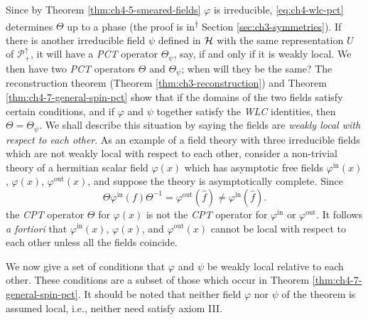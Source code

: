 Since by Theorem \ref{thm:ch4-5-smeared-fields} $\varphi$ is irreducible, \eqref{eq:ch4-wlc-pct} determines $\Theta$ up
to a phase (the proof is in\textsuperscript{\(\dagger\)} Section \ref{sec:ch3-symmetries}). If there
is another irreducible field $\psi$ defined in $\mathcal{H}$ with the same
representation $U$ of $\mathcal P_+^\uparrow$, it will have a \emph{PCT}
operator $\Theta_\psi$, say, if and only if it is weakly local. We then have
two \emph{PCT} operators $\Theta$ and $\Theta_\psi$; when will they be the
same? The reconstruction theorem (Theorem \ref{thm:ch3-reconstruction}) and Theorem \ref{thm:ch4-7-general-spin-pct} show that if
the domains of the two fields satisfy certain conditions, and if $\varphi$ and
$\psi$ together satisfy the \emph{WLC} identities, then
$\Theta=\Theta_\psi$. We shall describe
this situation by saying the fields are \emph{weakly local with respect to
each other}. As an example of a field theory with three irreducible fields
which are not weakly local with respect to each other, consider a non-trivial
theory of a hermitian scalar field $\varphi(x)$ which has asymptotic free
fields $\varphi^{\mathrm{in}}(x)$, $\varphi(x)$, $\varphi^{\mathrm{out}}(x)$,
and suppose the theory is asymptotically complete. Since
\begin{equation*}
  \Theta\varphi^{\mathrm{in}}(f)\Theta^{-1}
  =\varphi^{\mathrm{out}}(\widehat f)
  \ne \varphi^{\mathrm{in}}(\widehat f).
\end{equation*}
the \emph{CPT} operator $\Theta$ for $\varphi(x)$ is not the \emph{CPT}
operator for $\varphi^{\mathrm{in}}$ or $\varphi^{\mathrm{out}}$. It follows
\emph{a fortiori} that $\varphi^{\mathrm{in}}(x)$, $\varphi(x)$, and
$\varphi^{\mathrm{out}}(x)$ cannot be local with respect to each other unless
all the fields coincide.

We now give a set of conditions that $\varphi$ and $\psi$ be weakly local
relative to each other. These conditions are a subset of those which occur in
Theorem \ref{thm:ch4-7-general-spin-pct}. It should be noted that neither field $\varphi$ nor $\psi$ of the
theorem is assumed local, i.e., neither need satisfy axiom III.

